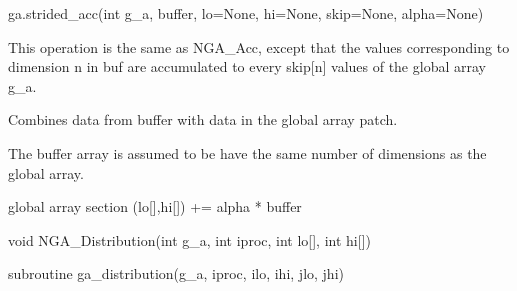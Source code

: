 \documentclass[10pt]{article}
\begin{document}
\begin{pyapi}
\begin{pycode}
ga.strided_acc(int g_a, buffer, lo=None, hi=None, skip=None, alpha=None)
\end{pycode}
\begin{funcargs}
\end{funcargs}
\end{pyapi}

\ncoll

\begin{desc}

This operation is the same as NGA_Acc, except that the values corresponding to
dimension n in buf are accumulated to every skip[n] values of the global array
g_a.

Combines data from buffer with data in the global array patch.

The buffer array is assumed to be have the same number of dimensions as the
global array.

global array section (lo[],hi[]) += alpha * buffer

\end{desc}



\begin{capi}
\begin{ccode}
void NGA_Distribution(int g_a, int iproc, int lo[], int hi[])
\end{ccode}
\begin{funcargs}
\end{funcargs}
\end{capi}

\begin{f2dapi}
\begin{fcode}
subroutine ga_distribution(g_a, iproc, ilo, ihi, jlo, jhi)
\end{fcode}
\begin{funcargs}
\end{funcargs}
\end{f2dapi}
\end{document}
